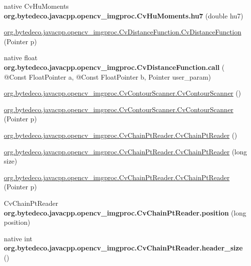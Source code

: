 \begin{DoxyCompactItemize}
\item 
\mbox{\label{group__imgproc_gab090a17241f585898a9f74757413f0f4}} 
native Cv\+Hu\+Moments {\bfseries org.\+bytedeco.\+javacpp.\+opencv\+\_\+imgproc.\+Cv\+Hu\+Moments.\+hu7} (double hu7)
\item 
\hyperlink{group__imgproc_ga13bd67072322fa3abbf57c43e0b0b43e}{org.\+bytedeco.\+javacpp.\+opencv\+\_\+imgproc.\+Cv\+Distance\+Function.\+Cv\+Distance\+Function} (Pointer p)
\item 
\mbox{\label{group__imgproc_ga43de4f0b2b36a25bab839a709516eb83}} 
native float {\bfseries org.\+bytedeco.\+javacpp.\+opencv\+\_\+imgproc.\+Cv\+Distance\+Function.\+call} ( @Const Float\+Pointer a, @Const Float\+Pointer b, Pointer user\+\_\+param)
\item 
\hyperlink{group__imgproc_ga48b4cf9a3994507c18e9b8fedf2150aa}{org.\+bytedeco.\+javacpp.\+opencv\+\_\+imgproc.\+Cv\+Contour\+Scanner.\+Cv\+Contour\+Scanner} ()
\item 
\hyperlink{group__imgproc_gacbac8305251f626940351e7e95e6b69a}{org.\+bytedeco.\+javacpp.\+opencv\+\_\+imgproc.\+Cv\+Contour\+Scanner.\+Cv\+Contour\+Scanner} (Pointer p)
\item 
\hyperlink{group__imgproc_ga3e9f307240cd0a45983beb3174b76f42}{org.\+bytedeco.\+javacpp.\+opencv\+\_\+imgproc.\+Cv\+Chain\+Pt\+Reader.\+Cv\+Chain\+Pt\+Reader} ()
\item 
\hyperlink{group__imgproc_ga3a01300ad23665f62104a167770a059c}{org.\+bytedeco.\+javacpp.\+opencv\+\_\+imgproc.\+Cv\+Chain\+Pt\+Reader.\+Cv\+Chain\+Pt\+Reader} (long size)
\item 
\hyperlink{group__imgproc_ga1288813916b70ce66630223fde9fbb95}{org.\+bytedeco.\+javacpp.\+opencv\+\_\+imgproc.\+Cv\+Chain\+Pt\+Reader.\+Cv\+Chain\+Pt\+Reader} (Pointer p)
\item 
\mbox{\label{group__imgproc_ga5b1a4fe9f27a96375e94b799ca9c463b}} 
Cv\+Chain\+Pt\+Reader {\bfseries org.\+bytedeco.\+javacpp.\+opencv\+\_\+imgproc.\+Cv\+Chain\+Pt\+Reader.\+position} (long position)
\item 
\mbox{\label{group__imgproc_gaf99e64d4095b69e09258778cff0ca188}} 
native int {\bfseries org.\+bytedeco.\+javacpp.\+opencv\+\_\+imgproc.\+Cv\+Chain\+Pt\+Reader.\+header\+\_\+size} ()
\item 
\mbox{\label{group__imgproc_ga378d39890fedf09caf02b28f2573ce2a}} 

\end{DoxyCompactItemize}
